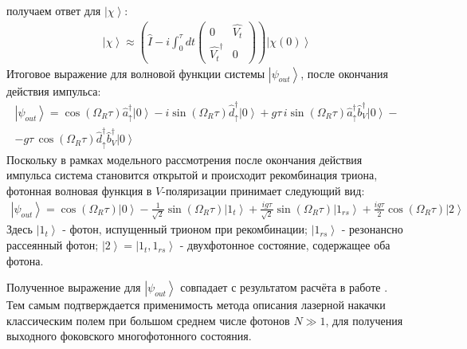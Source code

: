 \documentclass[11pt]{article}    %
\numberwithin{equation}{section}
\begin{document}
получаем ответ для $\left| \chi \right\rangle$:
\begin{gather}
    \left| \chi \right\rangle \approx \left( \hat{I} -i \int^\tau_0 dt
\begin{pmatrix}
    0 &  \hat{V_t} \\
     \hat{V_t}^{\dag} & 0
\end{pmatrix}
    \right) \left| \chi(0) \right\rangle
\end{gather}
Итоговое выражение для волновой функции системы
$\left| \psi_{out} \right\rangle$, после окончания действия импульса:
\begin{gather}
    \left| \psi_{out} \right\rangle = \cos(\Omega_R \tau) \hat{a}^{\dag}_{\uparrow} \left| 0 \right\rangle
    -i\sin(\Omega_R \tau) \hat{d}^{\dag}_{\uparrow} \left| 0 \right\rangle
    + g\tau \, i\sin(\Omega_R \tau) \hat{a}^{\dag}_{\uparrow} \hat{b}^{\dag}_{V} \left| 0 \right\rangle - \\ \nonumber
    - g\tau \, \cos(\Omega_R \tau) \hat{d}^{\dag}_{\uparrow} \hat{b}^{\dag}_{V} \left| 0 \right\rangle
\end{gather}
Поскольку в рамках модельного рассмотрения после окончания действия
импульса система становится открытой и происходит рекомбинация триона,
фотонная волновая функция в $V$-поляризации принимает следующий вид:
\begin{gather}
    \left| \psi_{out} \right\rangle = \cos(\Omega_R \tau) \left| 0 \right\rangle
    - \frac{1}{\sqrt{2}} \sin(\Omega_R \tau) \left| 1_t \right\rangle
    + \frac{i g\tau}{\sqrt{2}} \sin(\Omega_R \tau) \left| 1_{rs} \right\rangle
    + \frac{i g\tau}{2} \cos(\Omega_R \tau) \left| 2 \right\rangle
\end{gather}
Здесь $\left| 1_t \right\rangle$ - фотон, испущенный трионом при рекомбинации;
$\left| 1_{rs} \right\rangle$ - резонансно рассеянный фотон;
$\left| 2 \right\rangle = \left| 1_t, 1_{rs} \right\rangle$ - двухфотонное состояние,
содержащее оба фотона.

Полученное выражение для $\left| \psi_{out} \right\rangle$ совпадает с
результатом расчёта в работе \cite{krainov2025}.
Тем самым подтверждается применимость метода описания лазерной накачки
классическим полем при большом среднем числе фотонов $N \gg 1$,
для получения выходного фоковского многофотонного состояния.
\end{document}
